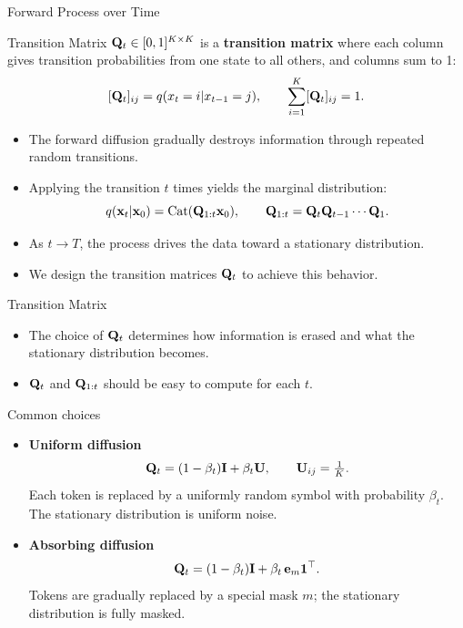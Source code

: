 \documentclass{beamer}
\begin{document}
\begin{frame}{Forward Process over Time}
	\begin{block}{Transition Matrix}
		$\mathbf{Q}_t \in [0,1]^{K \times K}$ is a \textbf{transition matrix} where each column gives transition probabilities from one state to all others, and columns sum to 1:
		\vspace{-0.5cm}
		\[
			[\mathbf{Q}_t]_{ij} = q(x_t = i | x_{t-1} = j),
			\qquad
			\sum_{i=1}^K [\mathbf{Q}_t]_{ij} = 1.
		\]
		\vspace{-0.7cm}
	\end{block}
	\eqpause
	\begin{itemize}
		\item The forward diffusion gradually destroys information through repeated random transitions.
		\eqpause
		\item Applying the transition $t$ times yields the marginal distribution:
			\[
				q(\mathbf{x}_t|\mathbf{x}_0) = \operatorname{Cat}(\mathbf{Q}_{1:t}\mathbf{x}_0),
				\qquad
				\mathbf{Q}_{1:t} = \mathbf{Q}_t \mathbf{Q}_{t-1}\cdots\mathbf{Q}_1.
			\]
		\eqpause
		\vspace{-0.7cm}
		\item As $t \to T$, the process drives the data toward a stationary distribution.
		\eqpause
		\item We design the transition matrices $\mathbf{Q}_t$ to achieve this behavior.
	\end{itemize}
\end{frame}
\begin{frame}{Transition Matrix}
	\begin{itemize}
		\item The choice of $\mathbf{Q}_t$ determines how information is erased and what the stationary distribution becomes.
		\eqpause
		\item $\mathbf{Q}_t$ and $\mathbf{Q}_{1:t}$ should be easy to compute for each $t$.
	\end{itemize}
	\eqpause
	\begin{block}{Common choices}
		\begin{itemize}
			\item \textbf{Uniform diffusion}
			\[
				\mathbf{Q}_t = (1 - \beta_t) \mathbf{I} + \beta_t \mathbf{U},
				\qquad
				\mathbf{U}_{ij} = \tfrac{1}{K}.
			\]
			Each token is replaced by a uniformly random symbol with probability $\beta_t$.
			The stationary distribution is uniform noise.
			\eqpause
			\item \textbf{Absorbing diffusion}
			\[
				\mathbf{Q}_t = (1-\beta_t)\mathbf{I} + \beta_t\, \mathbf{e}_m \mathbf{1}^\top.
			\]
			Tokens are gradually replaced by a special mask $m$;
			the stationary distribution is fully masked.
		\end{itemize}
	\end{block}
\end{frame}
\end{document}
